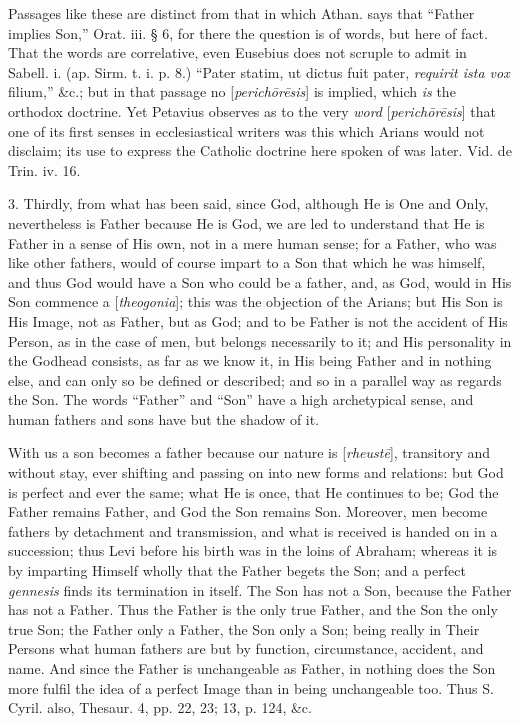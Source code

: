 Passages like these are distinct from that in
which Athan. says that ``Father implies Son,'' Orat. iii. § 6, for
there the question is of words, but here of fact. That the words are
correlative, even Eusebius does not scruple to admit in Sabell. i. (ap.
Sirm. t. i. p. 8.) ``Pater statim, ut dictus fuit pater, \emph{requirit
ista vox} filium,'' \&c.; but in that passage no [\emph{perich\={o}r\={e}sis}]
is implied, which \emph{is} the
orthodox doctrine. Yet Petavius observes as to the very \emph{word} [\emph{perich\={o}r\={e}sis}]
that one of its first senses in ecclesiastical writers was this
which Arians would not disclaim; its use to express the Catholic
doctrine here spoken of was later. Vid. de Trin. iv. 16.

3. Thirdly, from what has been said, since God,
although He is One and Only, nevertheless is Father because He is God,
we are led to understand that He is Father in a sense of His own, not
in a mere human sense; for a Father, who was like other fathers, would of course impart to a Son that which he was himself, and thus
God would have a Son who could be a father, and, as God, would in His
Son commence a [\emph{theogonia}];
this was the objection of the Arians; but His Son is His Image,
not as Father, but as God; and to be Father is not the accident of His
Person, as in the case of men, but belongs necessarily to it; and His
personality in the Godhead consists, as far as we know it, in His
being Father and in nothing else, and can only so be defined or
described; and so in a parallel way as regards the Son. The words ``Father''
and ``Son'' have a high archetypical sense, and human fathers and sons
have but the shadow of it.

With us a son becomes a father because our nature
is [\emph{rheust\={e}}], transitory and without stay, ever shifting
and passing on into new forms and relations: but God is perfect and
ever the same; what He is once, that He continues to be; God the
Father remains Father, and God the Son remains Son. Moreover, men
become fathers by detachment and transmission, and what is received is
handed on in a succession; thus Levi before his birth was in the loins
of Abraham; whereas it is by imparting Himself wholly that the Father
begets the Son; and a perfect \emph{gennesis} finds its termination in
itself. The Son has not a Son, because the Father has not a Father.
Thus the Father is the only true Father, and the Son the only true
Son; the Father only a Father, the Son only a Son; being really in
Their Persons what human fathers are but by function, circumstance,
accident, and name. And since the Father is unchangeable as Father, in
nothing does the Son more fulfil the idea of a perfect Image
than in being unchangeable too. Thus S. Cyril. also, Thesaur. 4, pp.
22, 23; 13, p. 124, \&c.

